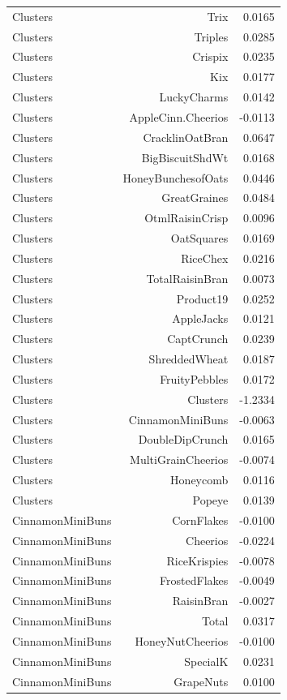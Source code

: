 \begin{longtable}{@{}lrr@{}}
Clusters & Trix & 0.0165 \\
Clusters & Triples & 0.0285 \\
Clusters & Crispix & 0.0235 \\
Clusters & Kix & 0.0177 \\
Clusters & LuckyCharms & 0.0142 \\
Clusters & AppleCinn.Cheerios & -0.0113 \\
Clusters & CracklinOatBran & 0.0647 \\
Clusters & BigBiscuitShdWt & 0.0168 \\
Clusters & HoneyBunchesofOats & 0.0446 \\
Clusters & GreatGraines & 0.0484 \\
Clusters & OtmlRaisinCrisp & 0.0096 \\
Clusters & OatSquares & 0.0169 \\
Clusters & RiceChex & 0.0216 \\
Clusters & TotalRaisinBran & 0.0073 \\
Clusters & Product19 & 0.0252 \\
Clusters & AppleJacks & 0.0121 \\
Clusters & CaptCrunch & 0.0239 \\
Clusters & ShreddedWheat & 0.0187 \\
Clusters & FruityPebbles & 0.0172 \\
Clusters & Clusters & -1.2334 \\
Clusters & CinnamonMiniBuns & -0.0063 \\
Clusters & DoubleDipCrunch & 0.0165 \\
Clusters & MultiGrainCheerios & -0.0074 \\
Clusters & Honeycomb & 0.0116 \\
Clusters & Popeye & 0.0139 \\
CinnamonMiniBuns & CornFlakes & -0.0100 \\
CinnamonMiniBuns & Cheerios & -0.0224 \\
CinnamonMiniBuns & RiceKrispies & -0.0078 \\
CinnamonMiniBuns & FrostedFlakes & -0.0049 \\
CinnamonMiniBuns & RaisinBran & -0.0027 \\
CinnamonMiniBuns & Total & 0.0317 \\
CinnamonMiniBuns & HoneyNutCheerios & -0.0100 \\
CinnamonMiniBuns & SpecialK & 0.0231 \\
CinnamonMiniBuns & GrapeNuts & 0.0100 \\

\end{longtable}
